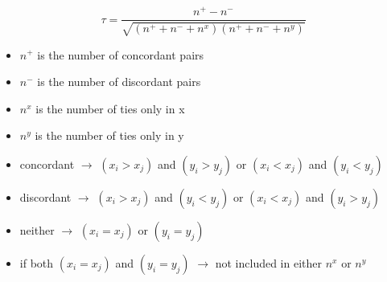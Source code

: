 \begin{equation}\label{eq:kendall}
	\tau = \frac{n^+-n^-}{\sqrt{(n^++n^-+n^x)(n^++n^-+n^y)}}
\end{equation}
\begin{itemize}
	\item $ n^+ $ is the number of concordant pairs
	\item $ n^- $ is the number of discordant pairs
	\item $ n^x $ is the number of ties only in x
	\item $ n^y $ is the number of ties only in y
	\item concordant $\rightarrow $ $ (x_i > x_j ) $ and $ (y_i > y_j ) $ or $ (x_i < x_j ) $ and $ (y_i < y_j ) $
	\item discordant $\rightarrow $ $ (x_i > x_j ) $ and $ (y_i < y_j ) $ or $ (x_i < x_j ) $ and $ (y_i > y_j ) $
	\item neither $\rightarrow $ $ (x_i = x_j ) $ or $ (y_i = y_j ) $
	\item if both $ (x_i = x_j ) $ and $ (y_i = y_j ) $ $\rightarrow $ not included in either $ n^x $ or $ n^y $
\end{itemize}




